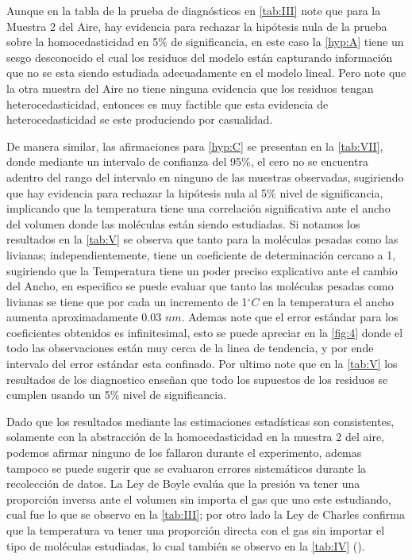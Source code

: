 \documentclass[12pt,a4paper]{config/myConfig}
\begin{document}
Aunque en la tabla de la prueba de diagnósticos en \cref{tab:III} note que para la Muestra 2 del Aire, hay evidencia para rechazar la hipótesis nula de la prueba sobre la homocedasticidad en 5\% de significancia, en este caso la \cref{hyp:A} tiene un sesgo desconocido el cual los residuos del modelo están capturando información que no se esta siendo estudiada adecuadamente en el modelo lineal. Pero note que la otra muestra del Aire no tiene ninguna evidencia que los residuos tengan heterocedasticidad, entonces es muy factible que esta evidencia de heterocedasticidad se este produciendo por casualidad. \newline
      
De manera similar, las afirmaciones para \cref{hyp:C} se presentan en la \cref{tab:VII}, donde mediante un intervalo de confianza del 95\%, el cero no se encuentra adentro del rango del intervalo en ninguno de las muestras observadas, sugiriendo que hay evidencia para rechazar la hipótesis nula al 5\% nivel de significancia, implicando que la temperatura tiene una correlación significativa ante el ancho del volumen donde las moléculas están siendo estudiadas. Si notamos los resultados en la \cref{tab:V} se observa que tanto para la moléculas pesadas como las livianas; independientemente, tiene un coeficiente de determinación cercano a 1, sugiriendo que la Temperatura tiene un poder preciso explicativo ante el cambio del Ancho, en especifico se puede evaluar que tanto las moléculas pesadas como livianas se tiene que por cada un incremento de 1$^\circ C$ en la temperatura el ancho aumenta aproximadamente 0.03 $nm$. Ademas note que el error estándar para los coeficientes obtenidos es infinitesimal, esto se puede apreciar en la \cref{fig:4} donde el todo las observaciones están muy cerca de la linea de tendencia, y por ende intervalo del error estándar esta confinado. Por ultimo note que en la \cref{tab:V} los resultados de los diagnostico enseñan que todo los supuestos de los residuos se cumplen usando un 5\% nivel de significancia. \newline 

Dado que los resultados mediante las estimaciones estadísticas son consistentes, solamente con la abstracción de la homocedasticidad en la muestra 2 del aire, podemos afirmar ninguno de los  fallaron durante el experimento, ademas tampoco se puede sugerir que se evaluaron errores sistemáticos durante la recolección de datos. La Ley de Boyle evalúa que la presión va tener una proporción inversa ante el volumen sin importa el gas que uno este estudiando, cual fue lo que se observo en la \cref{tab:III}; por otro lado la Ley de Charles confirma que la temperatura va tener una proporción directa con el gas sin importar el tipo de moléculas estudiadas, lo cual también se observo en la \cref{tab:IV} (\cite{physicsTextbook}).
\end{document}
